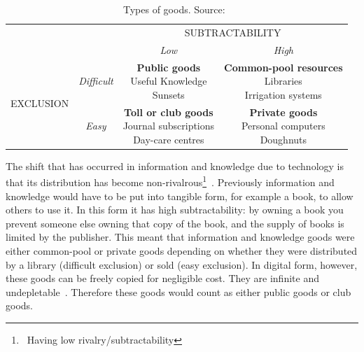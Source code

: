 \begin{table}
\centering
\caption[Types of goods]{Types of goods. Source:~\protect\citet{Hess2007}\label{table:goods}}
\begin{tabular}{cccc}
\multicolumn{2}{c}{} & \multicolumn{2}{c}{SUBTRACTABILITY} \\
\multicolumn{2}{c}{} & \textit{Low} & \textit{High} \\
\hline
\multirow{2}{*}{\begin{sideways}EXCLUSION\end{sideways}} & \textit{Difficult} & \parbox{4cm}{\vspace{.3\baselineskip}\textbf{Public goods}\\
Useful Knowledge\\
Sunsets} & \parbox{4.5cm}{\vspace{.3\baselineskip}\textbf{Common-pool resources}\\
Libraries\\
Irrigation systems} \\[0.6cm]
 & \textit{Easy} & \parbox{4cm}{\vspace{.3\baselineskip}\textbf{Toll or club goods}\\
 Journal subscriptions\\
 Day-care centres} & \parbox{4.5cm}{\vspace{.3\baselineskip}\textbf{Private goods}\\
 Personal computers\\
 Doughnuts} \\[0.7cm]
\end{tabular}
\end{table}

The shift that has occurred in information and knowledge due to technology is that its distribution has become non-rivalrous\footnote{\ie\ Having low rivalry/subtractability}~\citep{Ostrom2003,Bollier2007}.
Previously information and knowledge would have to be put into tangible form, for example a book, to allow others to use it. 
In this form it has high subtractability: by owning a book you prevent someone else owning that copy of the book, and the supply of books is limited by the publisher. 
This meant that information and knowledge goods were either common-pool or private goods depending on whether they were distributed by a library (difficult exclusion) or sold (easy exclusion). 
In digital form, however, these goods can be freely copied for negligible cost. 
They are infinite and undepletable~\citep{Bollier2007}. 
Therefore these goods would count as either public goods or club goods.

